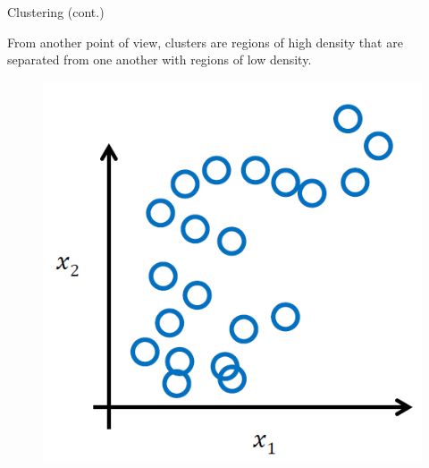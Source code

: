 \documentclass[serif, aspectratio=169]{beamer}
\begin{document}
\begin{frame}{Clustering (cont.)}
    \begin{minipage}{0.55\textwidth}
        From another point of view, clusters are regions of high density that are separated from one another with regions of low density.
    \end{minipage}%
    \begin{minipage}{0.4\textwidth}
        \begin{figure}
            \centering
            \includegraphics[scale=0.5]{pic/clusteriong_pov.png}
        \end{figure}
    \end{minipage}
\end{frame}
\end{document}
